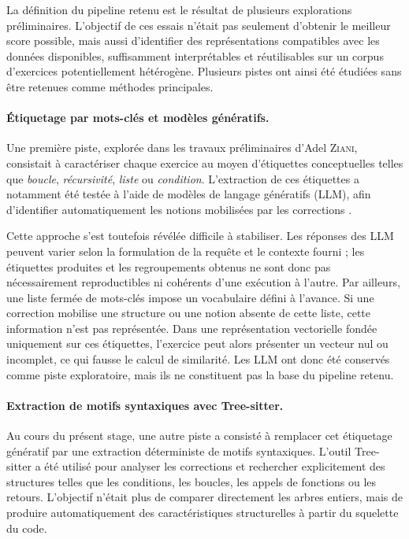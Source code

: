 \documentclass[12pt,a4paper,oneside]{report}
\begin{document}
La définition du pipeline retenu est le résultat de plusieurs explorations
préliminaires. L'objectif de ces essais n'était pas seulement d'obtenir le
meilleur score possible, mais aussi d'identifier des représentations
compatibles avec les données disponibles, suffisamment interprétables et
réutilisables sur un corpus d'exercices potentiellement hétérogène. Plusieurs
pistes ont ainsi été étudiées sans être retenues comme méthodes principales.

\paragraph{Étiquetage par mots-clés et modèles génératifs.}

Une première piste, explorée dans les travaux préliminaires d'Adel
\textsc{Ziani}, consistait à caractériser chaque exercice au moyen d'étiquettes
conceptuelles telles que \emph{boucle}, \emph{récursivité}, \emph{liste} ou
\emph{condition}. L'extraction de ces étiquettes a notamment été testée à
l'aide de modèles de langage génératifs (LLM), afin d'identifier
automatiquement les notions mobilisées par les corrections
\cite{ziani_detection_2025}.

Cette approche s'est toutefois révélée difficile à stabiliser. Les réponses
des LLM peuvent varier selon la formulation de la requête et le contexte
fourni ; les étiquettes produites et les regroupements obtenus ne sont donc
pas nécessairement reproductibles ni cohérents d'une exécution à l'autre.
Par ailleurs, une liste fermée de mots-clés impose un vocabulaire défini à
l'avance. Si une correction mobilise une structure ou une notion absente de
cette liste, cette information n'est pas représentée. Dans une représentation
vectorielle fondée uniquement sur ces étiquettes, l'exercice peut alors
présenter un vecteur nul ou incomplet, ce qui fausse le calcul de similarité.
Les LLM ont donc été conservés comme piste exploratoire, mais ils ne
constituent pas la base du pipeline retenu.

\paragraph{Extraction de motifs syntaxiques avec Tree-sitter.}

Au cours du présent stage, une autre piste a consisté à remplacer cet
étiquetage génératif par une extraction déterministe de motifs syntaxiques.
L'outil Tree-sitter a été utilisé pour analyser les corrections et rechercher
explicitement des structures telles que les conditions, les boucles, les
appels de fonctions ou les retours. L'objectif n'était plus de comparer
directement les arbres entiers, mais de produire automatiquement des
caractéristiques structurelles à partir du squelette du code.
\end{document}

